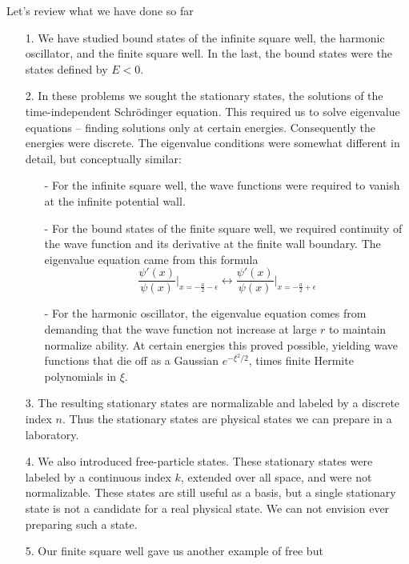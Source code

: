 Let's review what we have done so far 

\begin{itemize}
  \item[1.] We have studied bound states of the infinite square well, the
    harmonic oscillator, and the finite square well. In the last, the bound
    states were the states defined by $E<0$. 
  \item[2.] In these problems we sought the stationary states, the solutions of
    the time-independent Schr\"odinger equation. This required us to solve
    eigenvalue equations -- finding solutions only at certain energies.
    Consequently the energies were discrete. The eigenvalue conditions were
    somewhat different in detail, but conceptually similar: 
    \begin{itemize}
      \item[-] For the infinite square well, the wave functions were required
        to vanish at the infinite potential wall. 
      \item[-] For the bound states of the finite square well, we required
        continuity of the wave function and its derivative at the finite wall
        boundary. The eigenvalue equation came from this formula 
        \[ \frac{\psi'(x)}{\psi(x)}\Bigg|_{x = -\frac{a}{2} - \epsilon}
          \leftrightarrow \frac{\psi'(x)}{\psi(x)}\Bigg|_{x = -\frac{a}{2}
        + \epsilon} \] 
      \item[-] For the harmonic oscillator, the eigenvalue equation comes from
        demanding that the wave function not increase at large $r$ to maintain
        normalize ability. At certain energies this proved possible, yielding
        wave functions that die off as a Gaussian $e^{-\xi^2/2}$, times finite
        Hermite polynomials in $\xi$. 
    \end{itemize}
  \item[3.] The resulting stationary states are normalizable and labeled by
    a discrete index $n$. Thus the stationary states are physical states we can
    prepare in a laboratory. 
  \item[4.] We also introduced free-particle states. These stationary states
    were labeled by a continuous index $k$, extended over all space, and were
    not normalizable. These states are still useful as a basis, but a single
    stationary state is not a candidate for a real physical state. We can not
    envision ever preparing such a state. 
  \item[5.] Our finite square well gave us another example of free but

\end{itemize}
